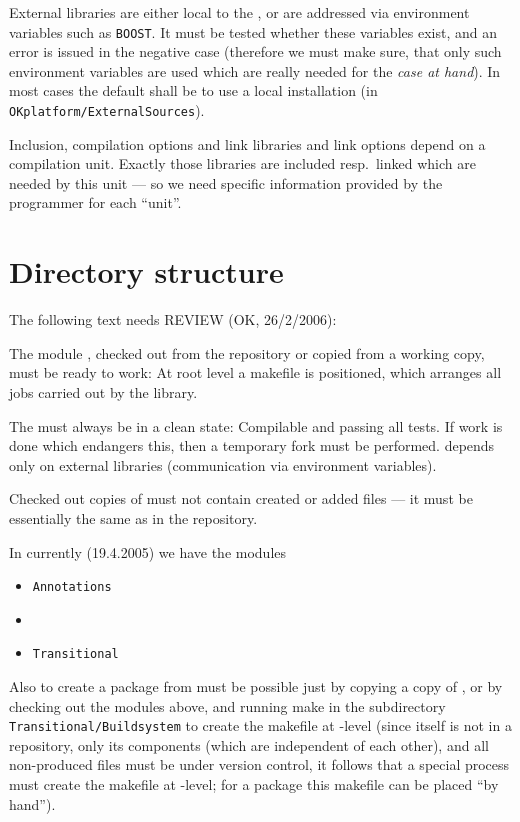 \documentclass{book}
\newcommand{\name}[1]{\texttt{#1}}
\begin{document}
External libraries are either local to the \OKlibrary, or are addressed via environment variables such as \texttt{BOOST}. It must be tested whether these variables exist, and an error is issued in the negative case (therefore we must make sure, that only such environment variables are used which are really needed for the \emph{case at hand}). In most cases the default shall be to use a local installation (in \name{OKplatform/ExternalSources}).

Inclusion, compilation options and link libraries and link options depend on a compilation unit. Exactly those libraries are included resp.~linked which are needed by this unit --- so we need specific information provided by the programmer for each ``unit''.



\section{Directory structure}
\label{sec:Buildsystemdirectorystructure}

The following text needs REVIEW (OK, 26/2/2006):

The module \OKlibrary{}, checked out from the repository or copied from a working copy, must be ready to work: At root level a makefile is positioned, which arranges all jobs carried out by the library.

The \OKlibrary{} must always be in a clean state: Compilable and passing all tests. If work is done which endangers this, then a temporary fork must be performed. \OKlibrary{} depends only on external libraries (communication via environment variables).

Checked out copies of \OKlibrary{} must not contain created or added files --- it must be essentially the same as in the repository.

In \OKsystem{} currently (19.4.2005) we have the modules
\begin{itemize}
\item \texttt{Annotations}
\item \OKlibrary
\item \texttt{Transitional}
\end{itemize}
Also to create a package from \OKsystem{} must be possible just by copying a copy of \OKsystem, or by checking out the modules above, and running make in the subdirectory \texttt{Transitional/Buildsystem} to create the makefile at \OKsystem-level (since \OKsystem{} itself is not in a repository, only its components (which are independent of each other), and all non-produced files must be under version control, it follows that a special process must create the makefile at \OKsystem-level; for a package this makefile can be placed ``by hand'').
\end{document}
